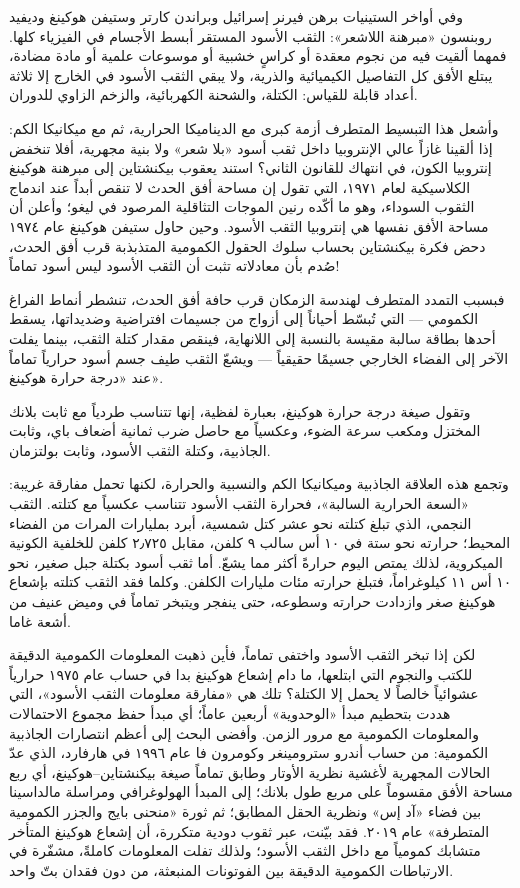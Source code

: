 \documentclass[12pt,a4paper,openany]{book}
\begin{document}
وفي أواخر الستينيات برهن فيرنر إسرائيل وبراندن كارتر وستيفن هوكينغ وديفيد روبنسون «مبرهنة اللاشعر»: الثقب الأسود المستقر أبسط الأجسام في الفيزياء كلها. فمهما ألقيت فيه من نجوم معقدة أو كراسٍ خشبية أو موسوعات علمية أو مادة مضادة، يبتلع الأفق كل التفاصيل الكيميائية والذرية، ولا يبقي الثقب الأسود في الخارج إلا ثلاثة أعداد قابلة للقياس: الكتلة، والشحنة الكهربائية، والزخم الزاوي للدوران.


وأشعل هذا التبسيط المتطرف أزمة كبرى مع الديناميكا الحرارية، ثم مع ميكانيكا الكم: إذا ألقينا غازاً عالي الإنتروبيا داخل ثقب أسود «بلا شعر» ولا بنية مجهرية، أفلا تنخفض إنتروبيا الكون، في انتهاك للقانون الثاني؟ استند يعقوب بيكنشتاين إلى مبرهنة هوكينغ الكلاسيكية لعام ١٩٧١، التي تقول إن مساحة أفق الحدث لا تنقص أبداً عند اندماج الثقوب السوداء، وهو ما أكّده رنين الموجات التثاقلية المرصود في ليغو؛ وأعلن أن مساحة الأفق نفسها هي إنتروبيا الثقب الأسود. وحين حاول ستيفن هوكينغ عام ١٩٧٤ دحض فكرة بيكنشتاين بحساب سلوك الحقول الكمومية المتذبذبة قرب أفق الحدث، صُدم بأن معادلاته تثبت أن الثقب الأسود ليس أسود تماماً!


فبسبب التمدد المتطرف لهندسة الزمكان قرب حافة أفق الحدث، تنشطر أنماط الفراغ الكمومي — التي تُبسّط أحياناً إلى أزواج من جسيمات افتراضية وضديداتها، يسقط أحدها بطاقة سالبة مقيسة بالنسبة إلى اللانهاية، فينقص مقدار كتلة الثقب، بينما يفلت الآخر إلى الفضاء الخارجي جسيمًا حقيقياً — ويشعّ الثقب طيف جسم أسود حرارياً تماماً عند «درجة حرارة هوكينغ».


وتقول صيغة درجة حرارة هوكينغ، بعبارة لفظية، إنها تتناسب طردياً مع ثابت بلانك المختزل ومكعب سرعة الضوء، وعكسياً مع حاصل ضرب ثمانية أضعاف باي، وثابت الجاذبية، وكتلة الثقب الأسود، وثابت بولتزمان.


وتجمع هذه العلاقة الجاذبية وميكانيكا الكم والنسبية والحرارة، لكنها تحمل مفارقة غريبة: «السعة الحرارية السالبة»، فحرارة الثقب الأسود تتناسب عكسياً مع كتلته. الثقب النجمي، الذي تبلغ كتلته نحو عشر كتل شمسية، أبرد بمليارات المرات من الفضاء المحيط؛ حرارته نحو ستة في ١٠ أس سالب ٩ كلفن، مقابل ٢٫٧٢٥ كلفن للخلفية الكونية الميكروية، لذلك يمتص اليوم حرارةً أكثر مما يشعّ. أما ثقب أسود بكتلة جبل صغير، نحو ١٠ أس ١١ كيلوغراماً، فتبلغ حرارته مئات مليارات الكلفن. وكلما فقد الثقب كتلته بإشعاع هوكينغ صغر وازدادت حرارته وسطوعه، حتى ينفجر ويتبخر تماماً في وميض عنيف من أشعة غاما.


لكن إذا تبخر الثقب الأسود واختفى تماماً، فأين ذهبت المعلومات الكمومية الدقيقة للكتب والنجوم التي ابتلعها، ما دام إشعاع هوكينغ بدا في حساب عام ١٩٧٥ حرارياً عشوائياً خالصاً لا يحمل إلا الكتلة؟ تلك هي «مفارقة معلومات الثقب الأسود»، التي هددت بتحطيم مبدأ «الوحدوية» أربعين عاماً؛ أي مبدأ حفظ مجموع الاحتمالات والمعلومات الكمومية مع مرور الزمن. وأفضى البحث إلى أعظم انتصارات الجاذبية الكمومية: من حساب أندرو سترومينغر وكومرون فا عام ١٩٩٦ في هارفارد، الذي عدّ الحالات المجهرية لأغشية نظرية الأوتار وطابق تماماً صيغة بيكنشتاين–هوكينغ، أي ربع مساحة الأفق مقسوماً على مربع طول بلانك؛ إلى المبدأ الهولوغرافي ومراسلة مالداسينا بين فضاء «آد إس» ونظرية الحقل المطابق؛ ثم ثورة «منحنى بايج والجزر الكمومية المتطرفة» عام ٢٠١٩. فقد بيّنت، عبر ثقوب دودية متكررة، أن إشعاع هوكينغ المتأخر متشابك كمومياً مع داخل الثقب الأسود؛ ولذلك تفلت المعلومات كاملةً، مشفّرة في الارتباطات الكمومية الدقيقة بين الفوتونات المنبعثة، من دون فقدان بتّ واحد.
\end{document}
